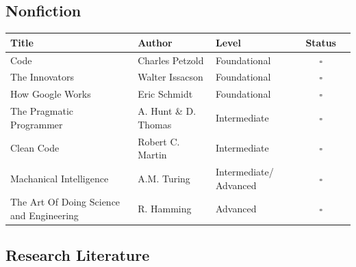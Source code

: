 \documentclass[10pt]{article}
\begin{document}
\subsection{Nonfiction}
\begin{center}
\begin{tabularx}{\textwidth}{X l l c c}
    \toprule
    \textbf{Title} & \textbf{Author} & \textbf{Level} & \textbf{Status} \\
    \midrule
    Code                                                & Charles Petzold            & Foundational               & $\square$ \\
    The Innovators                                      & Walter Issacson            & Foundational               & $\square$ \\
    How Google Works                                    & Eric Schmidt               & Foundational               & $\square$ \\
    The Pragmatic Programmer                            & A. Hunt \& D. Thomas       & Intermediate               & $\square$ \\
    Clean Code                                          & Robert C. Martin           & Intermediate               & $\square$ \\
    Machanical Intelligence                             & A.M. Turing                & Intermediate/ Advanced     & $\square$ \\
    The Art Of Doing Science and Engineering            & R. Hamming                 & Advanced                   & $\square$ \\                
    \bottomrule
\end{tabularx}
\end{center}


\subsection{Research Literature}
\end{document}
